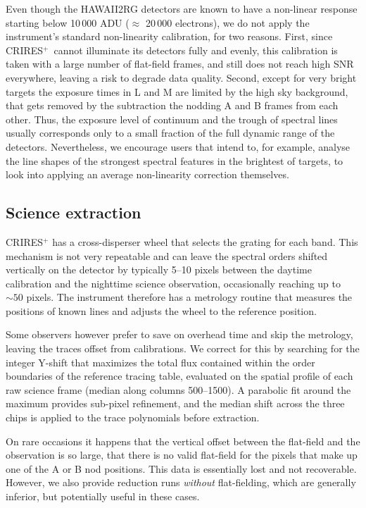 \documentclass{aa}
\newcommand{\crires}{CRIRES$^+$}
\begin{document}
Even though the HAWAII2RG detectors are known to have a non-linear
response starting below 10\,000 ADU ($\approx $ 20\,000 electrons), we do not
apply the instrument's standard non-linearity calibration, for two reasons. First, since
\crires\ cannot illuminate its detectors fully and evenly, this calibration is taken
with a large number of flat-field frames, and still does not reach high SNR everywhere, leaving
a risk to degrade data quality. Second, except for very bright targets
the exposure times  in L and M are limited by the high sky background, that 
gets removed by the subtraction the nodding A and B frames from each other.
Thus, the exposure level of continuum and the trough of spectral lines usually
corresponds only to a small fraction of the full dynamic range of the detectors.
Nevertheless, we encourage users that intend to, for example, analyse the line shapes
of the strongest spectral features in the brightest of targets, to look into
applying an average non-linearity correction themselves.

\subsection{Science extraction}
\label{sec:extraction}

\crires{} has a cross-disperser wheel that selects the grating for each band.
This mechanism is not very repeatable and can leave the spectral orders shifted
vertically on
the detector by typically 5--10 pixels between the daytime calibration
and the nighttime science observation, occasionally reaching up to
${\sim}50$ pixels. The instrument therefore has a metrology routine that 
measures the positions of known lines and adjusts the wheel to the 
reference position.

Some %
observers however prefer to save on overhead time and skip the metrology,
leaving the traces offset from calibrations.
We correct for this by searching for the integer Y-shift that
maximizes the total flux contained within the order boundaries of the
reference tracing table, evaluated on the spatial profile of each raw
science frame (median along columns 500--1500). A parabolic fit around
the maximum provides sub-pixel refinement, and the median shift across
the three chips is applied to the trace polynomials before extraction.

On rare occasions it happens that the vertical offset between the flat-field
and the observation is so large, that there is no valid flat-field for the pixels
that make up one of the A or B nod positions. This data is essentially lost
and not recoverable. However, we also provide reduction runs \emph{without}
flat-fielding, which are generally inferior, but potentially useful in these cases.
\end{document}
